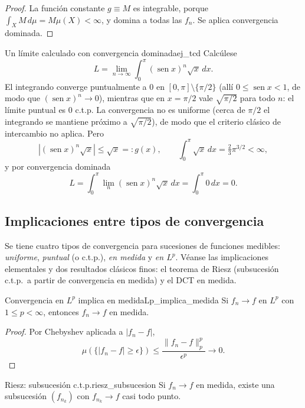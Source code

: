 \documentclass[11pt, a4paper]{article}
\begin{document}
\begin{proof}
La función constante $g \equiv M$ es integrable, porque $\int_X M \, d\mu = M \mu(X) < \infty$,
y domina a todas las $f_n$. Se aplica convergencia dominada.
\end{proof}

\begin{ejemplo}{Un límite calculado con convergencia dominada}{ej_tcd}
Calcúlese
$$ L = \lim_{n \to \infty} \int_0^\pi (\operatorname{sen} x)^n \sqrt{x} \, dx. $$
El integrando converge puntualmente a $0$ en $[0, \pi] \setminus \{\pi/2\}$ (allí
$0 \le \operatorname{sen} x < 1$, de modo que $(\operatorname{sen} x)^n \to 0$), mientras que en
$x = \pi/2$ vale $\sqrt{\pi/2}$ para todo $n$: el límite puntual es $0$ c.t.p. La convergencia
no es uniforme (cerca de $\pi/2$ el integrando se mantiene próximo a $\sqrt{\pi/2}$), de modo
que el criterio clásico de intercambio no aplica. Pero
$$ |(\operatorname{sen} x)^n \sqrt{x}| \le \sqrt{x} =: g(x), \qquad \int_0^\pi \sqrt{x} \, dx =
\tfrac{2}{3} \pi^{3/2} < \infty, $$
y por convergencia dominada
$$ L = \int_0^\pi \lim_n (\operatorname{sen} x)^n \sqrt{x} \, dx = \int_0^\pi 0 \, dx = 0. $$
\end{ejemplo}

\subsection{Implicaciones entre tipos de convergencia}

Se tiene cuatro tipos de convergencia para sucesiones de funciones medibles: \emph{uniforme},
\emph{puntual} (o c.t.p.), \emph{en medida} y \emph{en $L^p$}. Véanse las implicaciones
elementales y dos resultados clásicos finos: el teorema de Riesz (subsucesión c.t.p.\ a partir
de convergencia en medida) y el DCT en medida.

\begin{proposicion}{Convergencia en $L^p$ implica en medida}{Lp_implica_medida}
Si $f_n \to f$ en $L^p$ con $1 \le p < \infty$, entonces $f_n \to f$ en medida.
\end{proposicion}

\begin{proof}
Por Chebyshev aplicada a $|f_n - f|$,
$$ \mu(\{|f_n - f| \ge \epsilon\}) \le \frac{\|f_n - f\|_p^p}{\epsilon^p} \to 0. $$
\end{proof}

\begin{teorema}{Riesz: subsucesión c.t.p.}{riesz_subsucesion}
Si $f_n \to f$ en medida, existe una subsucesión $(f_{n_k})$ con $f_{n_k} \to f$ casi todo punto.
\end{teorema}
\end{document}
